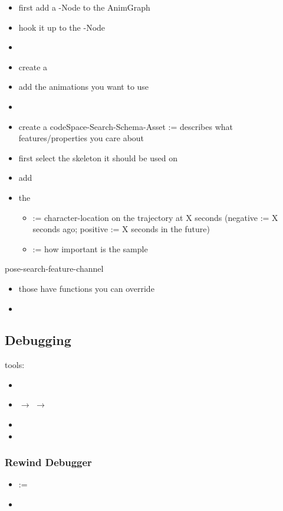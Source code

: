         \begin{itemize}
            \item first add a -Node to the AnimGraph
            \item hook it up to the -Node
            \item 
            \item create a 
            \item add the animations you want to use
            \item 
            \item create a code{Space-Search-Schema}-Asset := describes what features/properties you care about
            \item first select the skeleton it should be used on
            \item add 
            \item the 
            \begin{itemize}
                \item {} := character-location on the trajectory at X seconds (negative := X seconds ago; positive := X seconds in the future)
                \item {} := how important is the sample
            \end{itemize}
        \end{itemize}

        pose-search-feature-channel
        \begin{itemize}
            \item those have functions you can override
            \item 
        \end{itemize}

        \subsection{Debugging}
            tools:
            \begin{itemize}
                \item {}
                \item {} $\rightarrow$  $\rightarrow$ 
            \end{itemize}

            \begin{itemize}
                \item {}
                \item {}
            \end{itemize}

            \subsubsection{Rewind Debugger}
                \begin{itemize}
                    \item {} := 
                    \item 
                \end{itemize}
